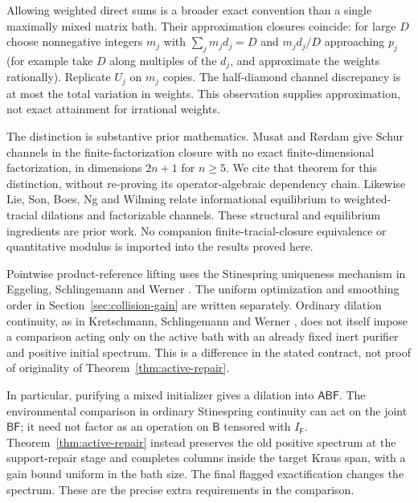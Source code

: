 \documentclass[11pt,a4paper]{article}
\numberwithin{equation}{section}
\theoremstyle{plain}
\theoremstyle{definition}
\newcommand{\rg}[1]{\mathsf{#1}}
\begin{document}
Allowing weighted direct sums is a broader exact convention than a single
maximally mixed matrix bath. Their approximation closures coincide: for large
$D$ choose nonnegative integers $m_j$ with $\sum_j m_j d_j=D$ and $m_jd_j/D$
approaching $p_j$ (for example take $D$ along multiples of the $d_j$, and
approximate the weights rationally). Replicate $U_j$ on $m_j$ copies. The
half-diamond channel discrepancy is at most the total variation in weights.
This observation supplies approximation, not exact attainment for irrational
weights.

The distinction is substantive prior mathematics. Musat and R\o rdam
\cite[Theorem 4.1]{MusatRordam2020} give Schur channels in the
finite-factorization closure with no exact finite-dimensional factorization,
in dimensions $2n+1$ for $n\ge 5$. We cite that theorem for this distinction,
without re-proving its operator-algebraic dependency chain. Likewise Lie, Son, Boes, Ng and Wilming
\cite[published Proposition 6 and Eq.~(12)]{Lie2026} relate informational
equilibrium to weighted-tracial dilations and factorizable channels. These
structural and equilibrium ingredients are prior work. No companion
finite-tracial-closure equivalence or quantitative modulus is imported into
the results proved here.

Pointwise product-reference lifting uses the Stinespring uniqueness mechanism
in Eggeling, Schlingemann and Werner \cite[section III]{Eggeling2002}.
The uniform optimization and smoothing
order in Section~\ref{sec:collision-gain} are written separately. Ordinary
dilation continuity, as in Kretschmann, Schlingemann and Werner
\cite[Definition 1 and Theorem 1]{Kretschmann2008}, does not itself impose a
comparison acting only on the active bath with an already fixed inert purifier
and positive initial spectrum. This is a difference in the stated contract,
not proof of originality of Theorem~\ref{thm:active-repair}.

In particular, purifying a mixed initializer gives a dilation into
$\rg{A}\rg{B}\rg{F}$. The environmental comparison in ordinary Stinespring
continuity can act on the joint $\rg{B}\rg{F}$; it need not factor as an
operation on $\rg{B}$ tensored with $I_{\rg{F}}$.
Theorem~\ref{thm:active-repair} instead preserves the old positive spectrum
at the support-repair stage and completes columns inside the target Kraus
span, with a gain bound uniform in the bath size. The final flagged
exactification changes the spectrum. These are the precise extra
requirements in the comparison.
\end{document}
